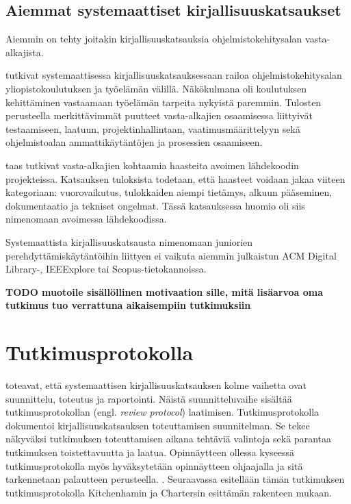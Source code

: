 \documentclass[utf8]{gradu3}
\begin{document}

\section{Aiemmat systemaattiset kirjallisuuskatsaukset}

Aiemmin on tehty joitakin kirjallisuuskatsauksia ohjelmistokehitysalan vasta-alkajista.

\textcite{garousi-ym-2020} tutkivat systemaattisessa kirjallisuuskatsauksessaan railoa ohjelmistokehitysalan yliopistokoulutuksen ja työelämän välillä. Näkökulmana oli koulutuksen kehittäminen vastaamaan työelämän tarpeita nykyistä paremmin. Tulosten perusteella merkittävimmät puutteet vasta-alkajien osaamisessa liittyivät testaamiseen, laatuun, projektinhallintaan, vaatimusmäärittelyyn sekä ohjelmistoalan ammattikäytäntöjen ja prosessien osaamiseen. 

\textcite{steinmacher-ym-2015} taas tutkivat vasta-alkajien kohtaamia haasteita avoimen lähdekoodin projekteissa. Katsauksen tuloksista todetaan, että haasteet voidaan jakaa viiteen kategoriaan: vuorovaikutus, tulokkaiden aiempi tietämys, alkuun pääseminen, dokumentaatio ja tekniset ongelmat. Tässä katsauksessa huomio oli siis nimenomaan avoimessa lähdekoodissa.

Systemaattista kirjallisuuskatsausta nimenomaan juniorien perehdyttämiskäytäntöihin liittyen ei vaikuta aiemmin julkaistun ACM Digital Library-, IEEExplore tai Scopus-tietokannoissa.

\textbf{TODO muotoile sisällöllinen motivaation sille, mitä lisäarvoa oma tutkimus tuo verrattuna aikaisempiin tutkimuksiin}

\chapter{Tutkimusprotokolla}

\textcite{kitchenham-charters-2007} toteavat, että systemaattisen kirjallisuuskatsauksen kolme vaihetta ovat suunnittelu, toteutus ja raportointi. Näistä suunnitteluvaihe sisältää tutkimusprotokollan (engl. \textit{review protocol}) laatimisen. Tutkimusprotokolla dokumentoi kirjallisuuskatsauksen toteuttamisen suunnitelman. Se tekee näkyväksi tutkimuksen toteuttamisen aikana tehtäviä valintoja sekä parantaa tutkimuksen toistettavuutta ja laatua. Opinnäytteen ollessa kyseessä tutkimusprotokolla myös hyväksytetään opinnäytteen ohjaajalla ja sitä tarkennetaan palautteen perusteella. \parencite{kitchenham-charters-2007}. Seuraavassa esitellään tämän tutkimuksen tutkimusprotokolla Kitchenhamin ja Chartersin esittämän rakenteen mukaan.
\end{document}
